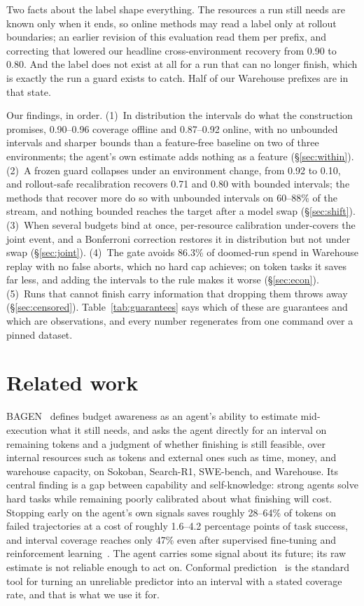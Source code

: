 \documentclass{article}
\begin{document}
Two facts about the label shape everything. The resources a run still needs are known only when it ends, so online methods may read a label only at rollout boundaries; an earlier revision of this evaluation read them per prefix, and correcting that lowered our headline cross-environment recovery from 0.90 to 0.80. And the label does not exist at all for a run that can no longer finish, which is exactly the run a guard exists to catch. Half of our Warehouse prefixes are in that state.

Our findings, in order. (1)~In distribution the intervals do what the construction promises, 0.90--0.96 coverage offline and 0.87--0.92 online, with no unbounded intervals and sharper bounds than a feature-free baseline on two of three environments; the agent's own estimate adds nothing as a feature (\S\ref{sec:within}). (2)~A frozen guard collapses under an environment change, from 0.92 to 0.10, and rollout-safe recalibration recovers 0.71 and 0.80 with bounded intervals; the methods that recover more do so with unbounded intervals on 60--88\% of the stream, and nothing bounded reaches the target after a model swap (\S\ref{sec:shift}). (3)~When several budgets bind at once, per-resource calibration under-covers the joint event, and a Bonferroni correction restores it in distribution but not under swap (\S\ref{sec:joint}). (4)~The gate avoids 86.3\% of doomed-run spend in Warehouse replay with no false aborts, which no hard cap achieves; on token tasks it saves far less, and adding the intervals to the rule makes it worse (\S\ref{sec:econ}). (5)~Runs that cannot finish carry information that dropping them throws away (\S\ref{sec:censored}). Table~\ref{tab:guarantees} says which of these are guarantees and which are observations, and every number regenerates from one command over a pinned dataset.

\section{Related work}
\label{sec:related}

BAGEN~\cite{lin2026bagen} defines budget awareness as an agent's ability to estimate mid-execution what it still needs, and asks the agent directly for an interval on remaining tokens and a judgment of whether finishing is still feasible, over internal resources such as tokens and external ones such as time, money, and warehouse capacity, on Sokoban, Search-R1, SWE-bench, and Warehouse. Its central finding is a gap between capability and self-knowledge: strong agents solve hard tasks while remaining poorly calibrated about what finishing will cost. Stopping early on the agent's own signals saves roughly 28--64\% of tokens on failed trajectories at a cost of roughly 1.6--4.2 percentage points of task success, and interval coverage reaches only 47\% even after supervised fine-tuning and reinforcement learning~\cite{lin2026bagen}. The agent carries some signal about its future; its raw estimate is not reliable enough to act on. Conformal prediction~\cite{angelopoulos2023gentle,lei2018distribution} is the standard tool for turning an unreliable predictor into an interval with a stated coverage rate, and that is what we use it for.
\end{document}
